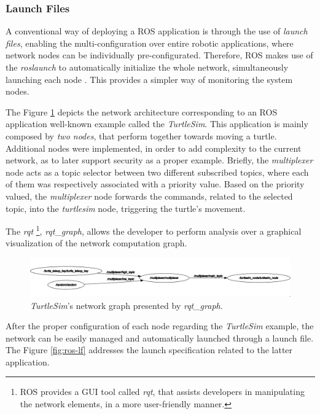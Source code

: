 \subsubsection{Launch Files}

A conventional way of deploying a ROS application is through the use of \textit{launch files}, enabling the multi-configuration over entire robotic applications, where network nodes can be individually pre-configurated. Therefore, ROS makes use of the \textit{roslaunch} to automatically initialize the whole network, simultaneously launching each node \cite{intro-ros}. This provides a simpler way of monitoring the system nodes. 

The Figure \ref{fig:ts-rqt-graph} depicts the network architecture corresponding to an ROS application well-known example called the \textit{TurtleSim}. This application is mainly composed by \textit{two nodes}, that perform together towards moving a turtle. Additional nodes were implemented, in order to add complexity to the current network, as to later support security as a proper example. Briefly, the \textit{multiplexer} node acts as a topic selector between two different subscribed topics, where each of them was respectively associated with a priority value. Based on the priority valued, the \textit{multiplexer} node forwards the commands, related to the selected topic, into the \textit{turtlesim} node, triggering the turtle's movement. 

The \textit{rqt} \footnote[1]{ROS provides a GUI tool called \textit{rqt}, that assists developers in manipulating the network elements, in a more user-friendly manner.}, \textit{rqt\_graph}, allows the developer to perform analysis over a graphical visualization of the network computation graph.

\begin{figure}[H]
    \centering
    \includegraphics[width=0.8\linewidth]{images/ts_rqt_graph.png}
    \caption{\textit{TurtleSim}'s network graph presented by \textit{rqt\_graph}.}
    \label{fig:ts-rqt-graph}
\end{figure}

After the proper configuration of each node regarding the \textit{TurtleSim} example, the network can be easily managed and automatically launched through a launch file. The Figure \ref{fig:ros-lf} addresses the launch specification related to the latter application.

